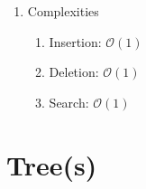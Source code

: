 \documentclass [12pt, executivepaper]{article}
\begin{document}
\begin{enumerate}
\item Complexities

\begin{enumerate}

\item Insertion: $\mathcal{O}(1)$

\item Deletion: $\mathcal{O}(1)$

\item Search: $\mathcal{O}(1)$

\end{enumerate}

\end{enumerate}

\pagebreak

\vspace*{-40mm}

\section*{Tree(s)}
\end{document}
